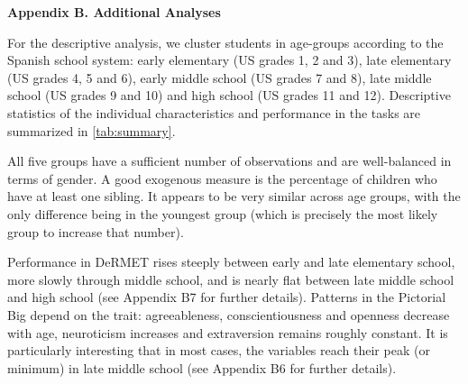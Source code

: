 \documentclass[11pt]{article}
\begin{document}
{ 
\clearpage

\centerline{\large {\bf Appendix B. Additional Analyses}} \par \vspace*{6mm}

\par \medskip

\noindent For the descriptive analysis, we cluster students in age-groups according to the Spanish school system: early elementary (US grades 1, 2 and 3), late elementary (US grades 4, 5 and 6), early middle school (US grades 7 and 8), late middle school (US grades 9 and 10) and high school (US grades 11 and 12). Descriptive statistics of the individual characteristics and performance in the tasks are summarized in \autoref{tab:summary}. 



All five groups have a sufficient number of observations and are well-balanced in terms of gender. A good exogenous measure is the percentage of children who have at least one sibling. It appears to be very similar across age groups, with the only difference being in the youngest group (which is precisely the most likely group to increase that number). 

Performance in DeRMET rises steeply between early and late elementary school, more slowly through middle school, and is nearly flat between late middle school and high school (see Appendix B7 for further details). Patterns in the Pictorial Big depend on the trait: agreeableness, conscientiousness and openness decrease with age, neuroticism increases and extraversion remains roughly constant. It is particularly interesting that in most cases, the variables reach their peak (or minimum) in late middle school (see Appendix B6 for further details). \par \bigskip

 \par \medskip



 


}
\end{document}
